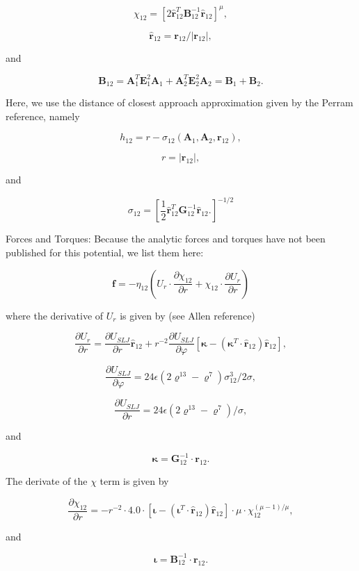 $$ \chi_{12} = [2 \hat{\mathbf{r}}_{12}^T \mathbf{B}_{12}^{-1}
\hat{\mathbf{r}}_{12}]^\mu, $$

$$ \hat{\mathbf{r}}_{12} = { \mathbf{r}_{12} } / |\mathbf{r}_{12}|, $$

and

$$ \mathbf{B}_{12} = \mathbf{A}_1^T \mathbf{E}_1^2 \mathbf{A}_1 +
\mathbf{A}_2^T \mathbf{E}_2^2 \mathbf{A}_2 = \mathbf{B}_1 +
\mathbf{B}_2. $$

Here, we use the distance of closest approach approximation given by the
Perram reference, namely

$$ h_{12} = r - \sigma_{12} ( \mathbf{A}_1, \mathbf{A}_2,
\mathbf{r}_{12} ), $$

$$ r = |\mathbf{r}_{12}|, $$

and

$$ \sigma_{12} = [ \frac{1}{2} \hat{\mathbf{r}}_{12}^T
\mathbf{G}_{12}^{-1} \hat{\mathbf{r}}_{12}.]^{ -1/2 } $$

Forces and Torques: Because the analytic forces and torques have not
been published for this potential, we list them here:

$$ \mathbf{f} = - \eta_{12} ( U_r \cdot { \frac{\partial \chi_{12}
}{\partial r} } + \chi_{12} \cdot { \frac{\partial U_r }{\partial r} }
) $$

where the derivative of $U_r$ is given by (see Allen reference)

$$ \frac{\partial U_r }{\partial r} = \frac{ \partial U_{SLJ} }{
\partial r } \hat{\mathbf{r}}_{12} + r^{-2} \frac{ \partial U_{SLJ} }{
\partial \varphi } [ \mathbf{\kappa} - ( \mathbf{\kappa}^T \cdot
\hat{\mathbf{r}}_{12}) \hat{\mathbf{r}}_{12} ], $$

$$ \frac{ \partial U_{SLJ} }{ \partial \varphi } = 24 \epsilon ( 2
\varrho^{13} - \varrho^7 ) \sigma_{12}^3 / 2 \sigma, $$

$$ \frac{ \partial U_{SLJ} }{ \partial r } = 24 \epsilon ( 2
\varrho^{13} - \varrho^7 ) / \sigma, $$

and

$$ \mathbf{\kappa} = \mathbf{G}_{12}^{-1} \cdot \mathbf{r}_{12}. $$

The derivate of the $\chi$ term is given by

$$ \frac{\partial \chi_{12} }{\partial r} = - r^{-2} \cdot 4.0 \cdot [
\mathbf{\iota} - ( \mathbf{\iota}^T \cdot \hat{\mathbf{r}}_{12} )
\hat{\mathbf{r}}_{12} ] \cdot \mu \cdot \chi_{12}^{ ( \mu -1 ) / \mu
}, $$

and

$$ \mathbf{\iota} = \mathbf{B}_{12}^{-1} \cdot \mathbf{r}_{12}. $$

